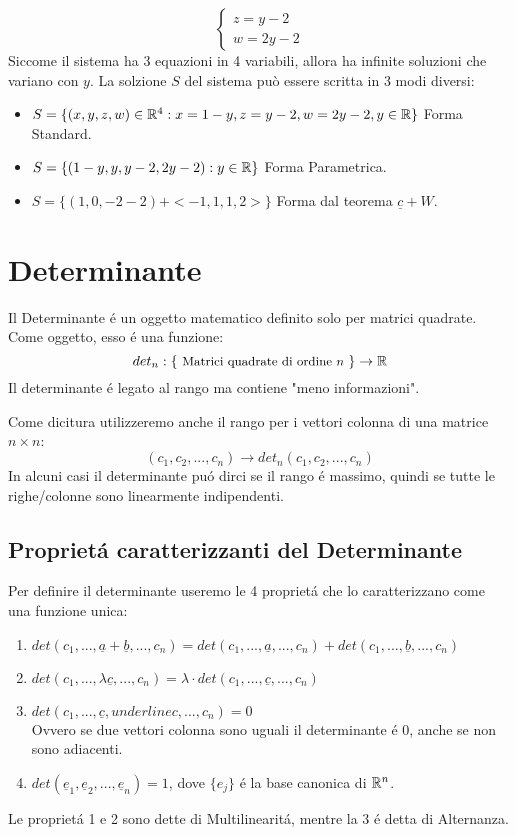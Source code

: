 {\begin{enumerate}
\[\begin{cases}
				      z=y-2 \\
				      w = 2y-2
			      \end{cases}
		      \]
		      Siccome il sistema ha 3 equazioni in 4 variabili, allora ha infinite soluzioni che variano con $y$.
		      La solzione $S$ del sistema può essere scritta in 3 modi diversi:
		      \begin{itemize}
			      \item $S=\{(x,y,z,w)\in \mathbb{R}^4 : x=1-y,z=y-2,w=2y-2, y\in \mathbb{R} \}$ Forma Standard.
			      \item $S=\{(1-y,y,y-2,2y-2):y\in\mathbb{R}\}$ Forma Parametrica.
			      \item $S=\{(1,0,-2-2)+<-1,1,1,2>\}$ Forma dal teorema $\underline{c} + W$.
		      \end{itemize}
	\end{enumerate}
}

\section{Determinante}
Il Determinante é un oggetto matematico definito solo per matrici quadrate.
Come oggetto, esso é una funzione:
\[
	det_n : \{\text{ \small{Matrici quadrate di ordine $n$} }	\} \to \mathbb{R}
\]
Il determinante é legato al rango ma contiene "meno informazioni".

Come dicitura utilizzeremo anche il rango per i vettori colonna di una matrice $n\times n$:
\[ (c_1,c_2, ... ,c_n) \to det_n(c_1,c_2,...,c_n)\]
In alcuni casi il determinante puó dirci se il rango é massimo, quindi se tutte le righe/colonne sono linearmente indipendenti.

\subsection{Proprietá caratterizzanti del Determinante}
Per definire il determinante useremo le 4 proprietá che lo caratterizzano come una funzione unica:
\begin{enumerate}
	\item $det(c_1,...,\underline{a}+ \underline{b},...,c_n) = det(c_1,...,\underline{a},...,c_n) + det(c_1,...,\underline{b},...,c_n)$
	\item $det(c_1,...,\lambda \underline{c},...,c_n) = \lambda \cdot det(c_1,...,\underline{c},...,c_n)$
	\item $det(c_1,...,\underline{c}, underline{c},...,c_n) = 0$ \\
	      Ovvero se due vettori colonna sono uguali il determinante é 0, anche se non sono adiacenti.
	\item $det(\underline{e}_1, \underline{e}_2,...,\underline{e}_n) = 1$, dove $\{e_j\}$ é la base canonica di $\mathbb{R}^n$.

\end{enumerate}
Le proprietá 1 e 2 sono dette di Multilinearitá, mentre la 3 é detta di Alternanza.

